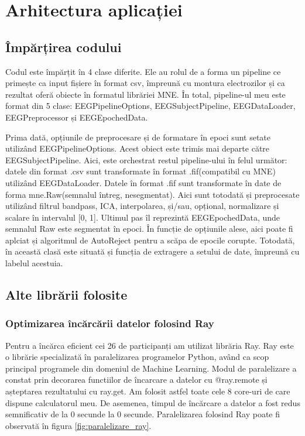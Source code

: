 \def\timpInainteDeRay{0}
\def\timpDupaRay{0}

\chapter{Arhitectura aplicației}
\section{Împărțirea codului}
Codul este împărțit în 4 clase diferite. Ele au rolul de a forma un pipeline ce primește ca input fișiere în format csv, împreună cu montura electrozilor și ca rezultat oferă obiecte în formatul librăriei MNE.
În total, pipeline-ul meu este format din 5 clase: EEGPipelineOptions, EEGSubjectPipeline, EEGDataLoader, EEGPreprocessor și EEGEpochedData. 

Prima dată, opțiunile de preprocesare și de formatare în epoci sunt setate utilizând EEGPipelineOptions. Acest obiect este trimis mai departe către EEGSubjectPipeline. Aici, este orchestrat restul pipeline-ului în felul următor: datele din format .csv sunt transformate în format .fif(compatibil cu MNE) utilizând EEGDataLoader. Datele în format .fif sunt transformate în date de forma mne.Raw(semnalul întreg, nesegmentat). Aici sunt totodată și preprocesate utilizând filtrul bandpass, ICA, interpolarea, și/sau, opțional, normalizare și scalare în intervalul [0, 1].  Ultimul pas îl reprezintă EEGEpochedData, unde semnalul Raw este segmentat în epoci. În funcție de opțiunile alese, aici poate fi aplciat și algoritmul de AutoReject pentru a scăpa de epocile corupte. Totodată, în această clasă este situată și funcția de extragere a setului de date, împreună cu labelul acestuia.


\section{Alte librării folosite}
\subsection{Optimizarea încărcării datelor folosind Ray}
Pentru a încărca eficient cei 26 de participanți am utilizat librăria Ray\cite{Ray}. Ray este o librărie specializată în paralelizarea programelor Python, având ca scop principal programele din domeniul de Machine Learning. Modul de paralelizare a constat prin decorarea functiilor de încarcare a datelor cu @ray.remote și așteptarea rezultatului cu ray.get. Am folosit astfel toate cele 8 core-uri de care dispune calculatorul meu. De asemenea, timpul de încărcare a datelor a fost redus semnificativ de la $\timpInainteDeRay$ secunde la $\timpDupaRay$ secunde. Paralelizarea folosind Ray poate fi observată în figura \ref{fig:paralelizare_ray}.

